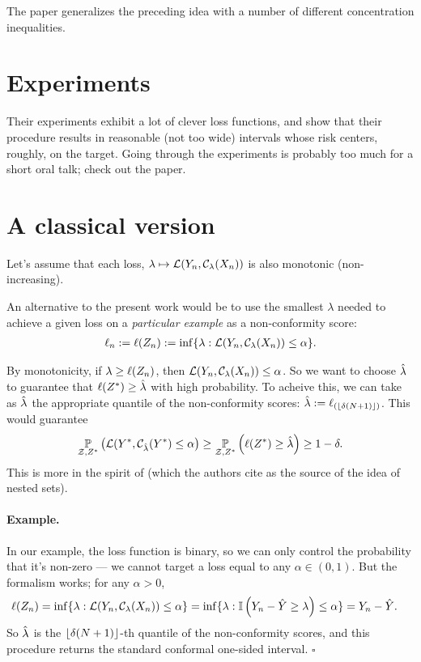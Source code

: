 \documentclass[twoside,11pt]{article}
\numberwithin{equation}{section}
\begin{document}
The paper generalizes the preceding idea with a number of different
concentration inequalities.






\section{Experiments}

Their experiments exhibit a lot of clever loss functions, and show that
their procedure results in reasonable (not too wide) intervals whose
risk centers, roughly, on the target.  Going through the experiments
is probably too much for a short oral talk; check out the paper.



\section{A classical version}

Let's assume that each loss, $\lambda \mapsto \mathcal{L}(Y_n, \mathcal{C}_\lambda(X_n))$
is also monotonic (non-increasing).

An alternative to the present work would be to use the smallest $\lambda$ needed
to achieve a given loss on a \textit{particular example} as a non-conformity
score:
%
\begin{align*}
%
\ell_n := \ell(\z_n) := \inf \{ \lambda: \loss(\y_n, \cfun_\lambda(\x_n)) \le \alpha \}.
%
\end{align*}

By monotonicity, if $\lambda \ge \ell(Z_n)$, then $\mathcal{L}(Y_n,
\mathcal{C}_\lambda(X_n)) \le \alpha$.  So we want to choose $\hat{\lambda}$ to
guarantee that $\ell(Z^{*}) \ge \hat{\lambda}$ with high probability. To acheive
this, we can take as $\hat{\lambda}$ the appropriate quantile of the non-conformity
scores: $\hat{\lambda} := \ell_{(\lfloor \delta (N + 1) \rfloor)}$. This would
guarantee
%
\begin{align*}
%
\p{\calset,\znew}{\loss(\ynew, \cfun_{\lambdahat} (\ynew) \le \alpha}
\ge
\p{\calset,\znew}{\ell(\znew) \ge \lambdahat}
\ge 1 - \delta.
%
\end{align*}
%
This is more in the spirit of \citet{gupta:2022:nestedconformal} (which the
authors cite as the source of the idea of nested sets).

\paragraph{Example. } In our example, the loss function is binary,
so we can only control the probability that it's non-zero
--- we cannot target a loss equal to any $\alpha \in (0, 1)$.
But the formalism works; for any $\alpha > 0$,
%
\begin{align*}
%
\ell(\z_n) =
\inf \{ \lambda: \loss(\y_n, \cfun_\lambda(\x_n)) \le \alpha \} &=
\inf \{ \lambda: \ind{\y_n - \yhat \ge \lambda} \le \alpha \} = \y_n - \yhat.
\end{align*}
%
So $\hat{\lambda}$ is the $\lfloor \delta (N + 1) \rfloor$-th quantile of the
non-conformity scores, and this procedure returns the standard conformal
one-sided interval. $\square$
\end{document}
